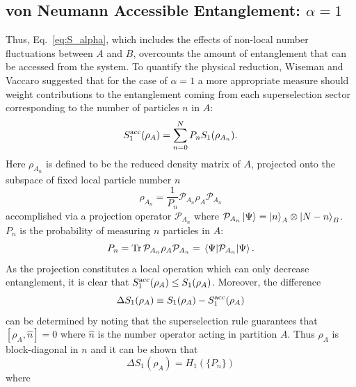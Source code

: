 \subsection{von Neumann Accessible Entanglement: $\alpha = 1$}

Thus, Eq.~\eqref{eq:S_alpha}, which includes the effects of non-local number fluctuations between $A$ and $B$, overcounts the amount of entanglement that can be accessed from the system.  To quantify the physical reduction, Wiseman and Vaccaro \cite{Wiseman:2003jx} suggested that for the case of $\alpha = 1$ a more appropriate measure should weight contributions to the entanglement coming from each superselection sector corresponding to the number of particles $n$ in $A$:
%
\begin{equation}
    S_1^{\rm{acc}}(\rho_A)=\sum_{n=0}^{N} P_n S_1(\rho_{A_n})
\label{eq:S1acc}.
\end{equation}
%
Here $\rho_{A_{n}}$ is defined to be the reduced density matrix of $A$, projected onto the subspace of fixed local particle number $n$ 
%
\begin{equation}
    \rho_{A_n} = \frac{1}{P_n}{\mathcal{P}}_{A_n} \rho_{A} {\mathcal{P}}_{A_n}
\label{eq:rhoAn}
\end{equation}
%
accomplished via a projection operator ${\mathcal{P}}_{A_n}$ where
${\mathcal{P}}_{A_n} \ket{\Psi} = \ket{n}_A\otimes\ket{N-n}_{B}$.  
$P_n$ is the probability of measuring $n$ particles in $A$:
%
\begin{equation}
    P_n = \mathrm{Tr}\, {\mathcal{P}}_{A_n} \rho_A{\mathcal{P}}_{A_n}
    = \expval{{\mathcal{P}}_{A_n}}{\Psi}.
    \label{eq:Pn}
\end{equation}
%
As the projection constitutes a local operation which can only decrease
entanglement,  it is clear that $S_1^{\rm acc}(\rho_A) \le S_1(\rho_A)$. 
Moreover, the difference 
%
\begin{equation}
    \Delta S_1 (\rho_A) \equiv S_1(\rho_A) - S_1^{\rm acc}(\rho_A)
    \label{eq:DeltaS1}
\end{equation}
%
can be determined  by noting that the superselection rule guarantees that $[\rho_A,\hat{n}]=0$ where $\hat{n}$ is the number operator acting in partition $A$. Thus $\rho_A$ is block-diagonal in $n$ and it can be shown \cite{Klich:2008se} that 
%
\begin{equation}
    \Delta S_1 (\rho_A) =  H_1(\{P_n\})
\label{eq:DS1H1}
\end{equation}
%
where
